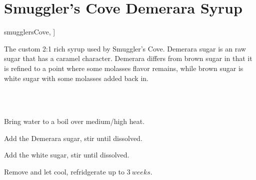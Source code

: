 \section[SC Demerara Syrup]{Smuggler's Cove Demerara Syrup}

\begin{recipestats}[
        servings=$1~C$,
        preptime=5~\minute,
        original=\citeauthor{smugglersCove}~\cite[p.~324]{smugglersCove},
    ]
\end{recipestats}

\begin{recipeabstract}
    The custom 2:1 rich syrup used by Smuggler's Cove.
    Demerara sugar is an raw sugar that has a caramel character.
    Demerara differs from brown sugar in that it is refined to a point where
    some molasses flavor remains,
    while brown sugar is white sugar with some molasses added back in.
\end{recipeabstract}

\begin{ingredientcolumns}[1]
    \begin{ingredientblock}
        \\
        \\
    \end{ingredientblock}
\end{ingredientcolumns}

\begin{preparation}
\item Bring water to a boil over medium/high heat.
\item Add the Demerara sugar, stir until dissolved.
\item Add the white sugar, stir until dissolved.
\item Remove and let cool, refridgerate up to $3~weeks$.
\end{preparation}

\recipeend
